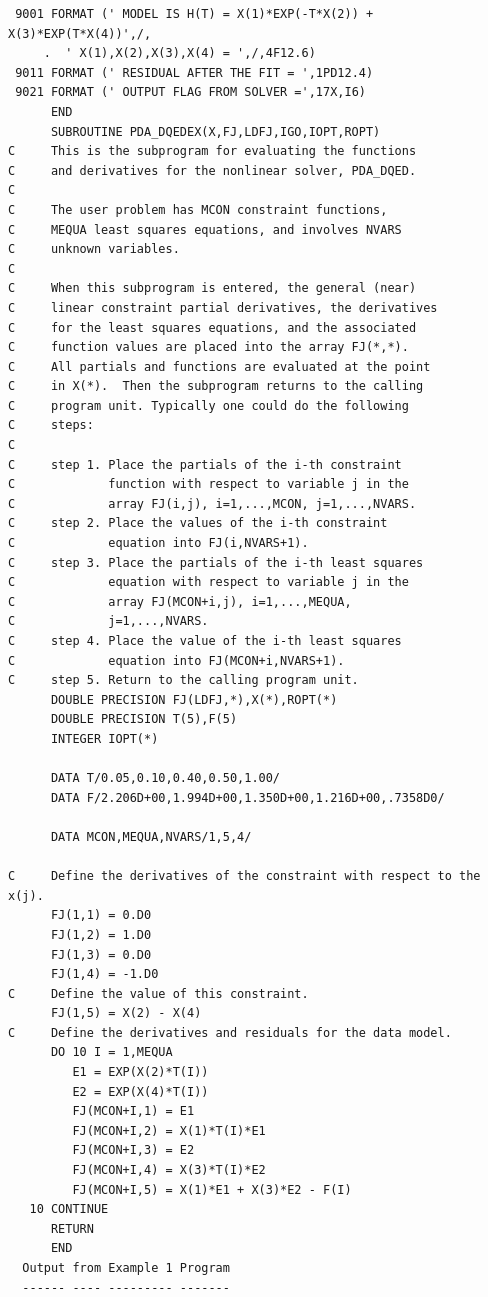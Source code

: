 \documentclass[11pt,twoside]{article}
\begin{document}
\begin{verbatim}
 9001 FORMAT (' MODEL IS H(T) = X(1)*EXP(-T*X(2)) + X(3)*EXP(T*X(4))',/,
     .  ' X(1),X(2),X(3),X(4) = ',/,4F12.6)
 9011 FORMAT (' RESIDUAL AFTER THE FIT = ',1PD12.4)
 9021 FORMAT (' OUTPUT FLAG FROM SOLVER =',17X,I6)
      END
      SUBROUTINE PDA_DQEDEX(X,FJ,LDFJ,IGO,IOPT,ROPT)
C     This is the subprogram for evaluating the functions
C     and derivatives for the nonlinear solver, PDA_DQED.
C
C     The user problem has MCON constraint functions,
C     MEQUA least squares equations, and involves NVARS
C     unknown variables.
C
C     When this subprogram is entered, the general (near)
C     linear constraint partial derivatives, the derivatives
C     for the least squares equations, and the associated
C     function values are placed into the array FJ(*,*).
C     All partials and functions are evaluated at the point
C     in X(*).  Then the subprogram returns to the calling
C     program unit. Typically one could do the following
C     steps:
C
C     step 1. Place the partials of the i-th constraint
C             function with respect to variable j in the
C             array FJ(i,j), i=1,...,MCON, j=1,...,NVARS.
C     step 2. Place the values of the i-th constraint
C             equation into FJ(i,NVARS+1).
C     step 3. Place the partials of the i-th least squares
C             equation with respect to variable j in the
C             array FJ(MCON+i,j), i=1,...,MEQUA,
C             j=1,...,NVARS.
C     step 4. Place the value of the i-th least squares
C             equation into FJ(MCON+i,NVARS+1).
C     step 5. Return to the calling program unit.
      DOUBLE PRECISION FJ(LDFJ,*),X(*),ROPT(*)
      DOUBLE PRECISION T(5),F(5)
      INTEGER IOPT(*)

      DATA T/0.05,0.10,0.40,0.50,1.00/
      DATA F/2.206D+00,1.994D+00,1.350D+00,1.216D+00,.7358D0/

      DATA MCON,MEQUA,NVARS/1,5,4/

C     Define the derivatives of the constraint with respect to the x(j).
      FJ(1,1) = 0.D0
      FJ(1,2) = 1.D0
      FJ(1,3) = 0.D0
      FJ(1,4) = -1.D0
C     Define the value of this constraint.
      FJ(1,5) = X(2) - X(4)
C     Define the derivatives and residuals for the data model.
      DO 10 I = 1,MEQUA
         E1 = EXP(X(2)*T(I))
         E2 = EXP(X(4)*T(I))
         FJ(MCON+I,1) = E1
         FJ(MCON+I,2) = X(1)*T(I)*E1
         FJ(MCON+I,3) = E2
         FJ(MCON+I,4) = X(3)*T(I)*E2
         FJ(MCON+I,5) = X(1)*E1 + X(3)*E2 - F(I)
   10 CONTINUE
      RETURN
      END
  Output from Example 1 Program
  ------ ---- --------- -------


\end{verbatim}
\end{document}
